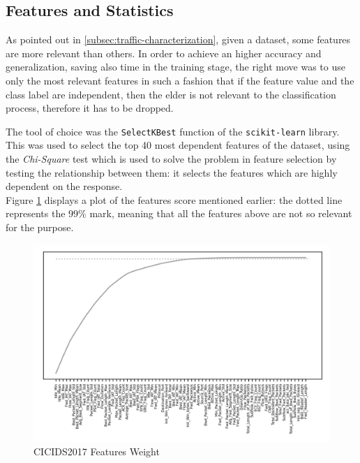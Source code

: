 
\subsection{Features and Statistics}
\label{subsec:features-statistics}

As pointed out in \ref{subsec:traffic-characterization}, given a dataset, some features are more relevant than others. In order to achieve an higher accuracy and generalization, saving also time in the training stage, the right move was to use only the most relevant features in such a fashion that if the feature value and the class label are independent, then the elder is not relevant to the classification process, therefore it has to be dropped.
\par The tool of choice was the \texttt{SelectKBest} function of the \texttt{scikit-learn} library. This was used to select the top 40 most dependent features of the dataset, using the \textit{Chi-Square} test which is used to solve the problem in feature selection by testing the relationship between them: it selects the features which are highly dependent on the response. \\ Figure \ref{fig:features-weight} displays a plot of the features score mentioned earlier: the dotted line  represents the $99\%$ mark, meaning that all the features above are not so relevant for the purpose.

\begin{figure}[h!]
    \centering
    \includegraphics[scale=1]{assets/figures/chapter3/features99.png}
    \caption{CICIDS2017 Features Weight}
    \label{fig:features-weight}
\end{figure}

